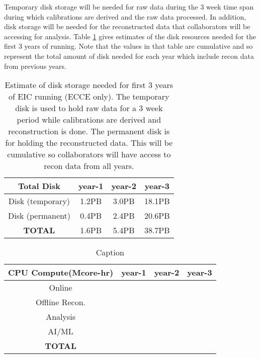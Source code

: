 Temporary disk storage will be needed for raw data during the 3 week time span during which calibrations are derived and the raw data processed. In addition, disk storage will be needed for the reconstructed data that collaborators will be accessing for analysis. Table \ref{tab:disk_summary} gives estimates of the disk resources needed for the first 3 years of running. Note that the values in that table are cumulative and so represent the total amount of disk needed for each year which include recon data from previous years.


\begin{table}[htb!]
    \centering
    \begin{tabular}{c|c|c|c}
        \hline
        \textbf{Total Disk} & year-1 & year-2 & year-3 \\
        \hline
        \hline
        Disk (temporary)  &  1.2PB & 3.0PB & 18.1PB \\
        \hline
        Disk (permanent)    & 0.4PB & 2.4PB &	20.6PB \\
        \hline
        \textbf{TOTAL}          & 1.6PB &	5.4PB &	38.7PB \\
        \hline
    \end{tabular}
    \caption{Estimate of disk storage needed for first 3 years of EIC running (ECCE only). The temporary disk is used to hold raw data for a 3 week period while calibrations are derived and reconstruction is done. The permanent disk is for holding the reconstructed data. This will be cumulative so collaborators will have access to recon data from all years.}
    \label{tab:disk_summary}
\end{table}

\begin{table}[htb!]
    \centering
    \begin{tabular}{c|c|c|c}
        \hline
        CPU Compute(Mcore-hr) & year-1 & year-2 & year-3 \\
        \hline
        \hline
        Online   & & & \\
        \hline
        Offline Recon. & & & \\
        \hline
        Analysis  & & & \\
        \hline
        AI/ML    & & & \\
        \hline
        \textbf{TOTAL} & & & \\
        \hline
    \end{tabular}
    \caption{Caption}
    \label{tab:cpu_summary}
\end{table}


